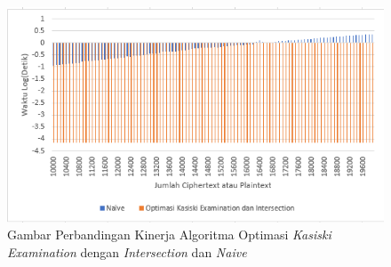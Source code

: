 	\begin{figure}[H]
	\centering
  	\includegraphics[scale=0.7]{images/bab5/ACD.png}
  	\caption{Gambar Perbandingan Kinerja Algoritma Optimasi \textit{Kasiski Examination} dengan \textit{Intersection} dan \textit{Naive}}
  	\label{fig:banding12}
	\end{figure}
	
	
